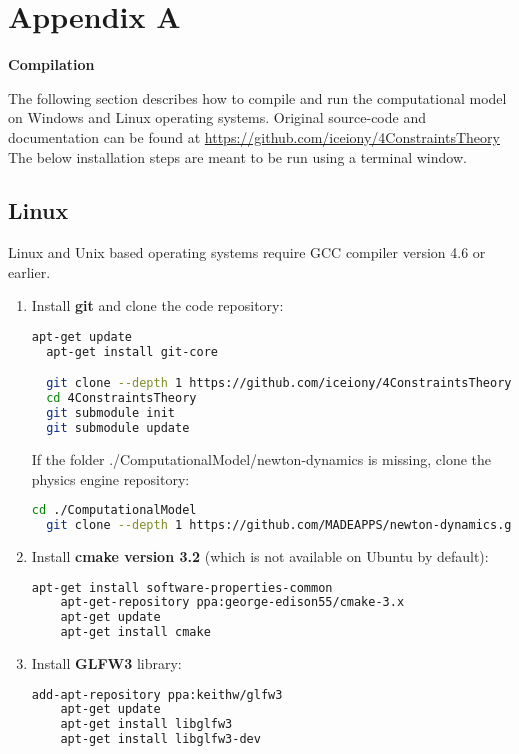\documentclass{article}
\let \shorttitle \textbf
\begin{document}
\section{Appendix A}
\shorttitle{Compilation}

The following section describes how to compile and run the computational model on Windows and Linux operating systems. 
Original source-code and documentation can be found at \url{https://github.com/iceiony/4ConstraintsTheory}
The below installation steps are meant to be run using a terminal window.

\subsection{Linux}
Linux and Unix based operating systems require GCC compiler version 4.6 or earlier. 
\begin{enumerate}
  \item Install \textbf{git} and clone the code repository: 
    \begin{lstlisting}[language=bash]
  apt-get update
  apt-get install git-core

  git clone --depth 1 https://github.com/iceiony/4ConstraintsTheory.git 
  cd 4ConstraintsTheory
  git submodule init
  git submodule update
    \end{lstlisting}

    If the folder ./ComputationalModel/newton-dynamics is missing, clone the physics engine repository:
    \begin{lstlisting}[language=bash]
  cd ./ComputationalModel
  git clone --depth 1 https://github.com/MADEAPPS/newton-dynamics.git 
    \end{lstlisting}

  \item Install \textbf{cmake version 3.2} (which is not available on Ubuntu by default): 
    \begin{lstlisting}[language=bash]
    apt-get install software-properties-common
    apt-get-repository ppa:george-edison55/cmake-3.x
    apt-get update
    apt-get install cmake
    \end{lstlisting}

  \item Install \textbf{GLFW3} library:
    \begin{lstlisting}[language=bash]
    add-apt-repository ppa:keithw/glfw3
    apt-get update
    apt-get install libglfw3
    apt-get install libglfw3-dev
    \end{lstlisting}


\end{enumerate}
\end{document}
